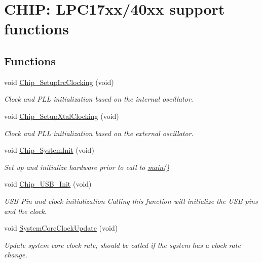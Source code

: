 \hypertarget{group__SUPPORT__17XX__40XX__FUNC}{}\section{C\+H\+IP\+: L\+P\+C17xx/40xx support functions}
\label{group__SUPPORT__17XX__40XX__FUNC}
\subsection*{Functions}
\begin{DoxyCompactItemize}
\item 
void \hyperlink{group__SUPPORT__17XX__40XX__FUNC_ga6eff97a8da15798119eada6c5f000404}{Chip\+\_\+\+Setup\+Irc\+Clocking} (void)
\begin{DoxyCompactList}\small\item\em Clock and P\+LL initialization based on the internal oscillator. \end{DoxyCompactList}\item 
void \hyperlink{group__SUPPORT__17XX__40XX__FUNC_ga18737e4a022570724c77c5cdea9c0258}{Chip\+\_\+\+Setup\+Xtal\+Clocking} (void)
\begin{DoxyCompactList}\small\item\em Clock and P\+LL initialization based on the external oscillator. \end{DoxyCompactList}\item 
void \hyperlink{group__SUPPORT__17XX__40XX__FUNC_ga3450fa020f6b569cc2deb69c11e11b7c}{Chip\+\_\+\+System\+Init} (void)
\begin{DoxyCompactList}\small\item\em Set up and initialize hardware prior to call to \hyperlink{group__Application__Layer_ga840291bc02cba5474a4cb46a9b9566fe}{main()} \end{DoxyCompactList}\item 
void \hyperlink{group__SUPPORT__17XX__40XX__FUNC_gaa098023402e8e6034f34663ce39d9ccd}{Chip\+\_\+\+U\+S\+B\+\_\+\+Init} (void)
\begin{DoxyCompactList}\small\item\em U\+SB Pin and clock initialization Calling this function will initialize the U\+SB pins and the clock. \end{DoxyCompactList}\item 
void \hyperlink{group__SUPPORT__17XX__40XX__FUNC_gae0c36a9591fe6e9c45ecb21a794f0f0f}{System\+Core\+Clock\+Update} (void)
\begin{DoxyCompactList}\small\item\em Update system core clock rate, should be called if the system has a clock rate change. \end{DoxyCompactList}\end{DoxyCompactItemize}
